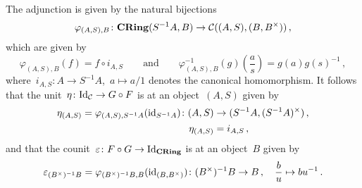 \subsection{}

The adjunction is given by the natural bijections
\[
          \varphi_{(A,S), B}
  \colon  \mathbf{CRing}(S^{-1} A, B)
  \to     \mathcal{C}((A,S), (B,B^\times)) \,,
\]
which are given by
\[
    \varphi_{(A,S),B}(f)
  = f \circ i_{A,S}
  \qquad\text{and}\qquad
    \varphi_{(A,S),B}^{-1}(g)\left( \frac{a}{s} \right)
  = g(a) g(s)^{-1} \,,
\]
where~$i_{A,S} \colon A \to S^{-1} A$,~$a \mapsto a/1$ denotes the canonical homomorphism.
It follows that the unit~$\eta \colon \mathrm{Id}_{\mathcal{C}} \to G \circ F$ is at an object~$(A,S)$ given by
\begin{align*}
            \eta_{(A,S)}
  =         \varphi_{(A,S), S^{-1} A}( \operatorname{id}_{S^{-1} A} )
  \colon    ( A, S )
  &\to      ( S^{-1} A, (S^{-1} A)^\times ) \,,
  \\
            \eta_{(A,S)}
  &=        i_{A,S} \,,
\end{align*}
and that the counit~$\varepsilon \colon F \circ G \to \mathrm{Id}_{\mathbf{CRing}}$ is at an object~$B$ given by
\[
            \varepsilon_{(B^\times)^{-1} B}
  =         \varphi_{(B^\times)^{-1} B, B}( \operatorname{id}_{(B,B^\times)} )
  \colon    (B^\times)^{-1} B
  \to       B \,,
  \quad     \frac{b}{u}
  \mapsto   b u^{-1} \,.
\]




